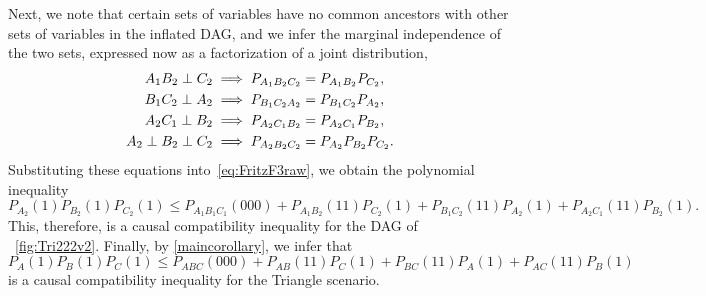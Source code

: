 {Next, we note that certain sets of variables have no common ancestors with other sets of variables in the inflated DAG, and we infer the marginal independence of the two sets, expressed now as a factorization of a joint distribution,
\begin{align}\begin{split}\label{eq:tri222fac}
A_1 B_2 \perp C_2 \implies	P_{A_1 B_2 C_2} &= P_{A_1 B_2} P_{C_2}, \\
B_1 C_2 \perp A_2 \implies	P_{B_1 C_2 A_2} &= P_{B_1 C_2} P_{A_2}, \\
A_2 C_1 \perp B_2 \implies	P_{A_2 C_1 B_2} &= P_{A_2 C_1} P_{B_2}, \\
A_2 \perp B_2 \perp C_2 \implies	P_{A_2 B_2 C_2} &= P_{A_2} P_{B_2} P_{C_2} .
\end{split}\end{align}
Substituting these equations into~\cref{eq:FritzF3raw}, we obtain the polynomial inequality
\begin{equation}%
	P_{A_2}(1) P_{B_2}(1) P_{C_2}(1) \leq P_{A_1 B_1 C_1 }(000) + P_{A_1 B_2}(11) P_{C_2}(1) + P_{B_1 C_2}(11) P_{A_2}(1) + P_{A_2 C_1}(11) P_{B_2}(1).
\end{equation}
This, therefore, is a causal compatibility inequality for the DAG of ~\cref{fig:Tri222v2}. Finally, by \cref{maincorollary}, we infer that 
\begin{equation}\label{eq:FritzF3}
	P_{A}(1) P_{B}(1) P_{C}(1) \leq P_{ABC}(000) + P_{AB}(11) P_C(1) + P_{BC}(11) P_A(1) + P_{AC}(11) P_B(1)
\end{equation}
is a causal compatibility inequality for the Triangle scenario.  

}
